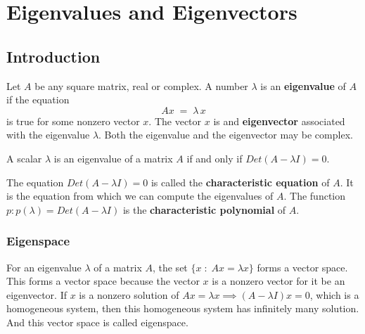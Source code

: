 \documentclass[math101_lecturenotes_ku.tex]{subfiles}
\begin{document}
\chapter{Eigenvalues and Eigenvectors}
\section{Introduction}
Let $A$ be any square matrix, real or complex. A number $\lambda$ is an \textbf{eigenvalue} of $A$ if the equation $$Ax\; = \; \lambda\,x$$
is true for some nonzero vector $x$. The vector $x$ is and \textbf{eigenvector} associated with the eigenvalue $\lambda$. Both the eigenvalue and the eigenvector may be complex.

\begin{theorem}
    A scalar $\lambda$ is an eigenvalue of a matrix $A$ if and only if $Det(A-\lambda I)=0$.
\end{theorem}
The equation $Det(A-\lambda I)=0$ is called the \textbf{characteristic equation} of $A$. It is the equation from which we can compute the eigenvalues of $A$. The function \\ $p: p(\lambda) = Det(A-\lambda I)$ is the \textbf{characteristic polynomial} of $A$.

\subsection{Eigenspace}
For an eigenvalue $\lambda$ of a matrix $A$, the set $\{x\; : \; Ax=\lambda x\}$ forms a vector space. This forms a vector space because the vector \(x\) is a nonzero vector for it be an eigenvector. If \(x\) is a nonzero solution of \(Ax=\lambda x \implies (A-\lambda I)x=0\), which is a homogeneous system, then this homogeneous system has infinitely many solution. And this vector space is called  eigenspace.
\end{document}
